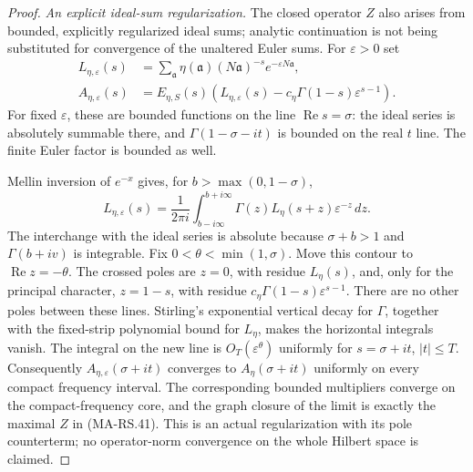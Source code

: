 \begin{proof}
\emph{An explicit ideal-sum regularization.}
The closed operator $Z$ also arises from bounded, explicitly
regularized ideal sums; analytic continuation is not being
substituted for convergence of the unaltered Euler sums.
For $\varepsilon>0$ set
\[
 \begin{aligned}
 L_{\eta,\varepsilon}(s)
     &=\sum_{\mathfrak a}\eta(\mathfrak a)(N\mathfrak a)^{-s}
                                           e^{-\varepsilon N\mathfrak a},\\
 A_{\eta,\varepsilon}(s)
     &=E_{\eta,S}(s)\left(
        L_{\eta,\varepsilon}(s)
             -c_\eta\Gamma(1-s)\varepsilon^{s-1}\right).
 \end{aligned}
 \tag{MA-RS.49}
\]
For fixed $\varepsilon$, these are bounded functions on the
line $\operatorname{Re}s=\sigma$: the ideal series is absolutely
summable there, and $\Gamma(1-\sigma-it)$ is bounded on the
real $t$ line. The finite Euler factor is bounded as well.

Mellin inversion of $e^{-x}$ gives, for $b>\max(0,1-\sigma)$,
\[
 L_{\eta,\varepsilon}(s)
   =\frac1{2\pi i}\int_{b-i\infty}^{b+i\infty}
                  \Gamma(z)L_\eta(s+z)\varepsilon^{-z}\,dz.
 \tag{MA-RS.50}
\]
The interchange with the ideal series is absolute because
$\sigma+b>1$ and $\Gamma(b+iv)$ is integrable.
Fix $0<\theta<\min(1,\sigma)$. Move this contour to
$\operatorname{Re}z=-\theta$.
The crossed poles are $z=0$, with residue $L_\eta(s)$,
and, only for the principal character, $z=1-s$, with residue
$c_\eta\Gamma(1-s)\varepsilon^{s-1}$.
There are no other poles between these lines.
Stirling's exponential vertical decay for $\Gamma$, together
with the fixed-strip polynomial bound for $L_\eta$, makes
the horizontal integrals vanish. The integral on the new
line is $O_T(\varepsilon^\theta)$ uniformly for
$s=\sigma+it$, $|t|\le T$.
Consequently $A_{\eta,\varepsilon}(\sigma+it)$ converges to
$A_\eta(\sigma+it)$ uniformly on every compact frequency
interval. The corresponding bounded multipliers converge on
the compact-frequency core, and the graph closure of the
limit is exactly the maximal $Z$ in (MA-RS.41).
This is an actual regularization with its pole counterterm;
no operator-norm convergence on the whole Hilbert space is claimed.


\end{proof}
